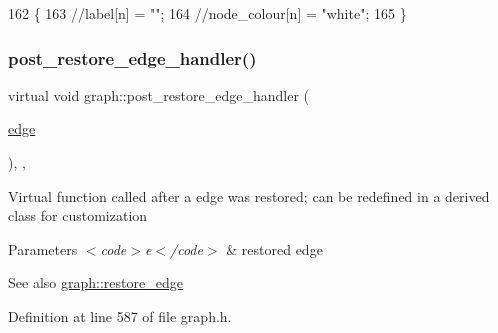 \begin{DoxyCode}
162     \{
163         \textcolor{comment}{//label[n] = "";}
164         \textcolor{comment}{//node\_colour[n] = "white";}
165     \}
\end{DoxyCode}
\mbox{\label{classgraph_adfc71011ae82f047c550eba6d9e7bb3a}} 
\subsubsection{\texorpdfstring{post\+\_\+restore\+\_\+edge\+\_\+handler()}{post\_restore\_edge\_handler()}}
{\footnotesize\ttfamily virtual void graph\+::post\+\_\+restore\+\_\+edge\+\_\+handler (\begin{DoxyParamCaption}\item[{\mbox{\hyperlink{classedge}{edge}}}]{ }\end{DoxyParamCaption})\hspace{0.3cm}{\ttfamily [inline]}, {\ttfamily [virtual]}, {\ttfamily [inherited]}}

Virtual function called after a edge was restored; can be redefined in a derived class for customization


\begin{DoxyParams}{Parameters}
{\em $<$code$>$e$<$/code$>$} & restored edge \\
\hline
\end{DoxyParams}
\begin{DoxySeeAlso}{See also}
\mbox{\hyperlink{classgraph_a2e5426682a0897b9f9104b019970bedc}{graph\+::restore\+\_\+edge}} 
\end{DoxySeeAlso}


Definition at line 587 of file graph.\+h.


